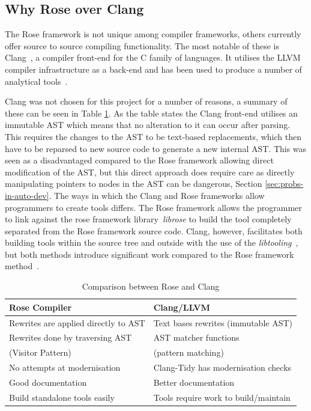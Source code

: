 \documentclass[bsc,frontabs,singlespacing,twoside,parskip,deptreport]{infthesis}
\begin{document}
\subsection{Why Rose over Clang}

The Rose framework is not unique among compiler frameworks, others currently offer source to source compiling functionality. The most notable of these is Clang~\cite{CLANG}, a compiler front-end for the C family of languages. It utilises the LLVM compiler infrastructure as a back-end and has been used to produce a number of analytical tools~\cite{CLANG_TOOLS}. 

Clang was not chosen for this project for a number of reasons, a summary of these can be seen in Table \ref{tab:cmp-rose-clang}. As the table states the Clang front-end utilises an immutable AST which means that no alteration to it can occur after parsing. This requires the changes to the AST to be text-based replacements, which then have to be reparsed to new source code to generate a new internal AST. This was seen as a disadvantaged compared to the Rose framework allowing direct modification of the AST, but this direct approach does require care as directly manipulating pointers to nodes in the AST can be dangerous, Section \ref{sec:probs-in-auto-dev}. The ways in which the Clang and Rose frameworks allow programmers to create tools differs. The Rose framework allows the programmer to link against the rose framework library~\textit{librose} to build the tool completely separated from the Rose framework source code. Clang, however, facilitates both building tools within the source tree and outside with the use of the \textit{libtooling}~\cite{CLANG_TOOLS_LIB}, but both methods introduce significant work compared to the Rose framework method~\cite{ROSE_MAKE}. 

\begin{table}[h]
    \begin{center}
        \begin{tabular}{| l | l |}
            \hline
             \textbf{Rose Compiler}               & \textbf{Clang/LLVM}                 \\ \hline
             Rewrites are applied directly to AST & Text bases rewrites (immutable AST) \\ \hline
             Rewrites done by traversing AST      & AST matcher functions               \\ 
             (Visitor Pattern)                    & (pattern matching)                  \\ \hline
             No attempts at modernisation         & Clang-Tidy has modernisation checks \\ \hline
             Good documentation                   & Better documentation                \\ \hline
             Build standalone tools easily        & Tools require work to build/maintain\\ \hline
        \end{tabular}
        \caption{Comparison between Rose and Clang }
        \label{tab:cmp-rose-clang}
    \end{center}
\end{table}
    
\end{document}
